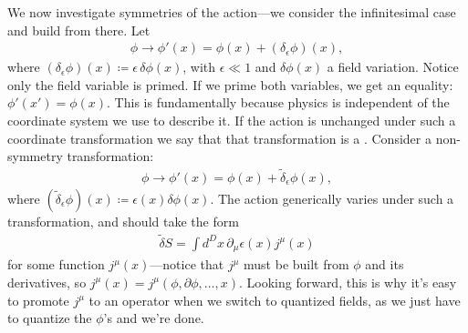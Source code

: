 \documentclass[11pt]{article}
\begin{document}
We now investigate symmetries of the action---we consider the infinitesimal
case and build from there. Let
\begin{align*}
    \phi \to \phi'(x) = \phi(x) + (\delta_\epsilon \phi)(x),
\end{align*}
where $(\delta_\epsilon \phi)(x) \coloneqq \epsilon \, \delta \phi(x)$,
with $\epsilon \ll 1$ and $\delta \phi(x)$ a field variation.
Notice only the field variable is primed. If we prime both
variables, we get an equality: $\phi'(x') = \phi(x)$. This
is fundamentally because physics is independent of the coordinate
system we use to describe it. If the action is unchanged
under such a coordinate transformation we say that that
transformation is a . Consider a non-symmetry
transformation:
\begin{align*}
    \phi \to \phi'(x) = \phi(x) + \tilde{\delta}_\epsilon \phi(x),
\end{align*}
where $(\tilde{\delta}_\epsilon \phi)(x) \coloneqq \epsilon(x) \delta \phi(x)$.
The action generically varies under such a transformation, and should take the form
\begin{align*}
    \tilde{\delta} S = \int d^D x \, \partial_\mu \epsilon(x) j^\mu(x)
\end{align*}
for some function $j^\mu(x)$---notice that $j^\mu$ must be built from
$\phi$ and its derivatives, so $j^\mu(x) = j^\mu(\phi, \partial \phi, \ldots, x)$.
Looking forward, this is why it's easy to promote $j^\mu$ to an operator
when we switch to quantized fields, as we just have to quantize the $\phi$'s and
we're done. 
\end{document}
